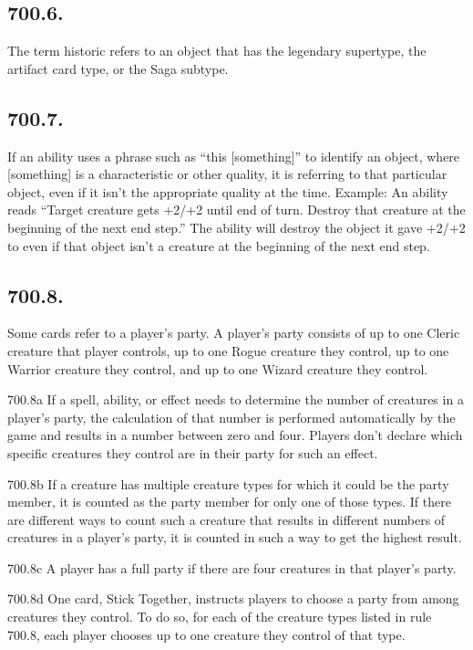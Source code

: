 \subsection*{700.6.}
The term historic refers to an object that has the legendary supertype, the artifact card type, or the Saga subtype.

\subsection*{700.7.}
If an ability uses a phrase such as “this [something]” to identify an object, where [something] is a characteristic or other quality, it is referring to that particular object, even if it isn’t the appropriate quality at the time.
Example: An ability reads “Target creature gets +2/+2 until end of turn. Destroy that creature at the beginning of the next end step.” The ability will destroy the object it gave +2/+2 to even if that object isn’t a creature at the beginning of the next end step.

\subsection*{700.8.}
Some cards refer to a player’s party. A player’s party consists of up to one Cleric creature that player controls, up to one Rogue creature they control, up to one Warrior creature they control, and up to one Wizard creature they control.

700.8a If a spell, ability, or effect needs to determine the number of creatures in a player’s party, the calculation of that number is performed automatically by the game and results in a number between zero and four. Players don’t declare which specific creatures they control are in their party for such an effect.

700.8b If a creature has multiple creature types for which it could be the party member, it is counted as the party member for only one of those types. If there are different ways to count such a creature that results in different numbers of creatures in a player’s party, it is counted in such a way to get the highest result.

700.8c A player has a full party if there are four creatures in that player’s party.

700.8d One card, Stick Together, instructs players to choose a party from among creatures they control. To do so, for each of the creature types listed in rule 700.8, each player chooses up to one creature they control of that type.

